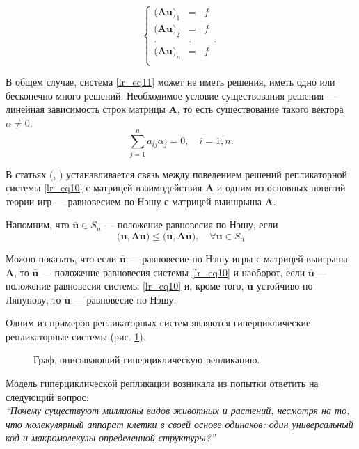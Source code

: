 \begin{equation}
\left\{
\begin{array}{rcl}
\Big(\mathbf{Au}\Big)_{1} & = & f\\
\Big(\mathbf{Au}\Big)_{2} & = & f\\
. \quad & . & \quad .\\
\Big(\mathbf{Au}\Big)_{n} & = & f\\
\end{array}
\right.
\label{lr_eq11}
\end{equation}

В общем случае, система \eqref{lr_eq11} может не иметь решения, иметь одно или бесконечно много решений. Необходимое условие существования решения --- линейная зависимость строк матрицы $\mathbf{A}$, то есть существование такого вектора $\alpha \neq 0$:
$$
\sum\limits_{j = 1}^{n}a_{ij}\alpha_{j} = 0, \quad i = \overline{1, n}.
$$ 

В статьях  (\cite{Hofbauer1}, \cite{Hofbauer2}) устанавливается связь между поведением решений репликаторной системы \eqref{lr_eq10} с матрицей взаимодействия $\mathbf{A}$ и одним из основных понятий теории игр --- равновесием по Нэшу с матрицей выишрыша $\mathbf{A}$. 

Напомним, что $\overline{\mathbf{u}} \in S_{n}$ --- положение равновесия по Нэшу, если
$$
\Big(\mathbf{u, A\overline{u}}\Big) \le \Big(\mathbf{\overline{u}, A\overline{u}}\Big), \quad \forall \mathbf{u} \in S_{n}
$$    

Можно показать, что если $\overline{\mathbf{u}}$ --- равновесие по Нэшу игры с матрицей выиграша $\mathbf{A}$, то $\overline{\mathbf{u}}$ --- положение равновесия системы \eqref{lr_eq10} и наоборот, если $\overline{\mathbf{u}}$ --- положение равновесия системы \eqref{lr_eq10} и, кроме того, $\overline{\mathbf{u}}$ устойчиво по Ляпунову, то $\overline{\mathbf{u}}$ --- равновесие по Нэшу.

Одним из примеров репликаторных систем являются гиперциклические репликаторные системы (рис. \ref{lr_fig3}).

\begin{figure}[ht]
\caption{Граф, описывающий гиперциклическую репликацию.}
\label{lr_fig3}
\end{figure}

Модель гиперциклической репликации возникала из попытки ответить на следующий вопрос:\\
 
\textit{``Почему существуют миллионы видов животных и растений, несмотря на то, что молекулярный аппарат клетки в своей основе одинаков: один универсальный код и макромолекулы определенной структуры?''\,}\\

